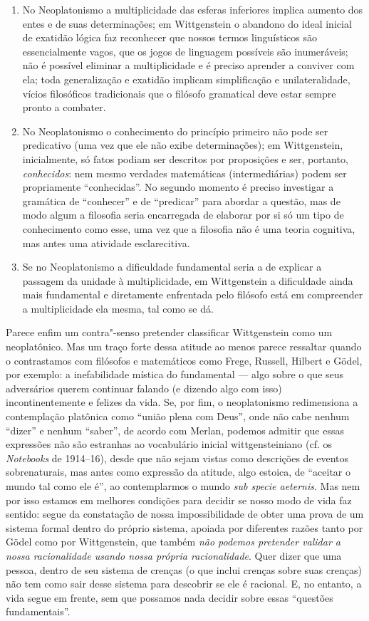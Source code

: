{\begin{enumerate}
\item No Neoplatonismo a multiplicidade das esferas inferiores
implica aumento dos entes e de suas determinações; em
Wittgenstein o abandono do ideal inicial de exatidão lógica faz
reconhecer que nossos termos linguísticos são essencialmente
vagos, que os jogos de linguagem possíveis são inumeráveis; não
é possível eliminar a multiplicidade e é preciso aprender a
conviver com ela; toda generalização e exatidão implicam
simplificação e unilateralidade, vícios filosóficos tradicionais
que o filósofo gramatical deve estar sempre pronto a combater.

\item No Neoplatonismo o conhecimento do princípio primeiro não
pode ser predicativo (uma vez que ele não exibe determinações);
em Wittgenstein, inicialmente, só fatos podiam ser descritos por
proposições e ser, portanto, \emph{conhecidos}: nem mesmo
verdades matemáticas (intermediárias) podem ser propriamente
``conhecidas''. No segundo
momento é preciso investigar a gramática de ``conhecer'' e de
``predicar'' para abordar a questão, mas de modo algum a filosofia
seria encarregada de elaborar por si só um tipo de conhecimento
como esse, uma vez que a filosofia não é uma teoria cognitiva,
mas antes uma atividade esclarecitiva.

\item Se no Neoplatonismo a dificuldade fundamental seria a de
explicar a passagem da unidade à multiplicidade, em Wittgenstein
a dificuldade ainda mais fundamental e diretamente enfrentada
pelo filósofo está em compreender a multiplicidade ela mesma,
tal como se dá.
\end{enumerate}

Parece enfim um contra"-senso pretender classificar
Wittgenstein como um neoplatônico. Mas um traço forte dessa
atitude ao menos parece ressaltar quando o contrastamos com
filósofos e matemáticos como Frege, Russell, Hilbert e Gödel,
por exemplo: a inefabilidade mística do fundamental --- algo sobre
o que seus adversários querem continuar falando (e dizendo algo
com isso) incontinentemente e felizes da vida. Se, por fim, o
neoplatonismo redimensiona a contemplação platônica como “união
plena com Deus”, onde não cabe nenhum
``dizer'' e nenhum
``saber'', de acordo com Merlan,
podemos admitir que essas expressões não são estranhas ao
vocabulário inicial wittgensteiniano (cf. os \emph{Notebooks}
de 1914--16), desde que não sejam vistas como descrições de
eventos sobrenaturais, mas antes como expressão da atitude, algo
estoica, de “aceitar o mundo tal como ele é”, ao contemplarmos o
mundo \emph{sub specie aeternis}. Mas nem por isso estamos em
melhores condições para decidir se nosso modo de vida faz
sentido: segue da constatação de nossa impossibilidade de obter
uma prova de um sistema formal dentro do próprio sistema,
apoiada por diferentes razões tanto por Gödel como por
Wittgenstein, que também \emph{não podemos pretender validar a
nossa racionalidade usando nossa própria racionalidade}. Quer
dizer que uma pessoa, dentro de seu sistema de crenças (o que
inclui crenças sobre suas crenças) não tem como sair desse
sistema para descobrir se ele é racional. E, no entanto, a vida
segue em frente, sem que possamos nada decidir sobre essas
``questões fundamentais''.

}
